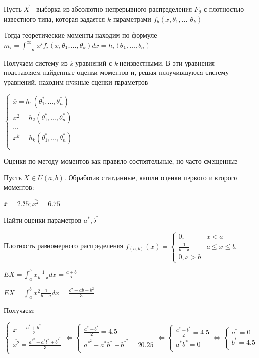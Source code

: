 \documentclass[12pt]{article}
\begin{document}
Пусть $\vec{X}$ - выборка из абсолютно непрерывного распределения $F_\theta$ с плотностью известного типа, 
которая задается $k$ параметрами $f_\theta (x, \theta_1, \dots, \theta_k)$

Тогда теоретические моменты находим по формуле $m_i = \int_{-\infty}^{\infty} x^i f_\theta (x, \theta_1, \dots, \theta_k) dx = h_i(\theta_1, \dots, \theta_n)$

Получаем систему из $k$ уравнений с $k$ неизвестными. В эти уравнения подставляем найденные оценки
моментов и, решая получившуюся систему уравнений, находим нужные оценки параметров

$\begin{cases}
    \overline{x} = h_1(\theta_1^*, \dots, \theta_n^*) \\ 
    \overline{x^2} = h_2(\theta_1^*, \dots, \theta_n^*) \\ 
    \dots \\
    \overline{x^k} = h_k(\theta_1^*, \dots, \theta_n^*) \\ 
\end{cases}$

\Nota Оценки по методу моментов как правило состоятельные, но часто смещенные

\Ex Пусть $X \in U(a, b)$. Обработав статданные, нашли оценки первого и второго моментов:

$\overline{x} = 2.25; \overline{x^2} = 6.75$

Найти оценки параметров $a^*, b^*$

Плотность равномерного распределения $f_{(a, b)} (x) = \begin{cases}0, & x < a \\ \frac{1}{b - a} & a \leq x \leq b, \\ 0, x > b\end{cases}$

$EX = \int_a^b x \frac{1}{b - a} dx = \frac{a + b}{2}$

$EX = \int_a^b x^2 \frac{1}{b - a} dx = \frac{a^2 + ab + b^2}{3}$

\mediumvspace

Получаем:

$\begin{cases}
    \overline{x} = \frac{a^* + b^*}{2} \\ 
    \overline{x^2} = \frac{a^*^2 + a^* b^* + b^*^2}{3} \\ 
\end{cases} \Longleftrightarrow \begin{cases}
    \frac{a^* + b^*}{2} = 4.5 \\ 
    a^*^2 + a^* b^* + b^*^2 = 20.25 \\ 
\end{cases} \Longleftrightarrow \begin{cases}
    \frac{a^* + b^*}{2} = 4.5 \\ 
    a^* b^* = 0 \\ 
\end{cases} \Longleftrightarrow \begin{cases}
    a^* = 0 \\ 
    b^* = 4.5 \\ 
\end{cases}$
\end{document}
